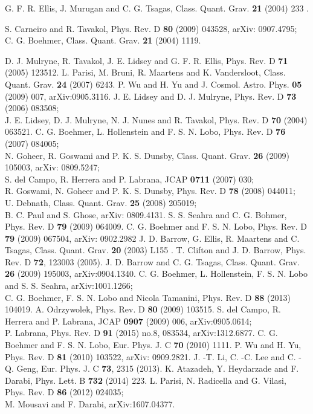 \documentclass[showpacs,amsmath,nofootinbib,amssymb,epsfig]{revtex4}
\begin{document}
\begin{thebibliography}{}
G. F. R. Ellis, J. Murugan and C. G. Tsagas,  Class. Quant. Grav. {\bf 21} (2004) 233 .

 S. Carneiro and R. Tavakol, Phys. Rev. D {\bf 80} (2009) 043528,  arXiv: 0907.4795; \\C. G. Boehmer, Class. Quant. Grav. {\bf21} (2004) 1119.

  D. J. Mulryne, R. Tavakol, J. E. Lidsey and  G. F. R. Ellis,  Phys. Rev. D {\bf 71} (2005) 123512.
  L. Parisi, M. Bruni, R. Maartens and K. Vandersloot, Class. Quant. Grav. {\bf 24} (2007) 6243.
      P. Wu and H. Yu and J. Cosmol. Astro. Phys. {\bf 05} (2009) 007,  arXiv:0905.3116.
 J. E. Lidsey and D. J. Mulryne,  Phys. Rev. D {\bf 73} (2006) 083508;\\J. E. Lidsey, D. J. Mulryne, N. J. Nunes and
R. Tavakol, Phys. Rev. D \textbf{70} (2004) 063521.
 C. G. Boehmer, L. Hollenstein and F. S. N. Lobo,  Phys. Rev. D {\bf 76} (2007) 084005;\\
                     N. Goheer, R. Goswami and P. K. S. Dunsby, Class. Quant. Grav. {\bf 26} (2009) 105003,  arXiv: 0809.5247;\\
                     S. del Campo, R. Herrera and P. Labrana, JCAP {\bf 0711} (2007)  030;\\
                     R. Goswami, N. Goheer and P. K. S. Dunsby, Phys. Rev. D {\bf 78} (2008) 044011;\\
                     U. Debnath, Class. Quant. Grav. {\bf 25} (2008) 205019;\\
                     B. C. Paul  and S. Ghose, arXiv: 0809.4131.
 S. S. Seahra and C. G. Bohmer,  Phys. Rev. D {\bf 79} (2009) 064009.
 C. G. Boehmer and F. S. N. Lobo,  Phys. Rev. D {\bf 79} (2009) 067504,  arXiv: 0902.2982
  J. D. Barrow, G. Ellis, R. Maartens and C. Tsagas, Class. Quant. Grav. {\bf 20} (2003) L155 .
 T. Clifton and J. D. Barrow, Phys. Rev. D {\bf 72},  123003 (2005).
 J. D. Barrow and C. G. Tsagas, Class. Quant. Grav. {\bf 26} (2009) 195003, arXiv:0904.1340.
 C. G. Boehmer, L. Hollenstein, F. S. N. Lobo and  S. S. Seahra, arXiv:1001.1266;\\
C. G. Boehmer, F. S. N. Lobo and Nicola Tamanini, Phys. Rev. D {\bf 88} (2013) 104019.
 A. Odrzywolek, Phys. Rev. D {\bf 80} (2009) 103515.
S. del Campo, R. Herrera and P. Labrana, JCAP \textbf{0907} (2009) 006, arXiv:0905.0614;\\
P. Labrana, Phys. Rev. D \textbf{91} (2015) no.8, 083534, arXiv:1312.6877.
C. G. Boehmer and F. S. N. Lobo, Eur. Phys. J. C {\bf 70} (2010) 1111.
 P. Wu and H. Yu, Phys. Rev. D {\bf 81}  (2010) 103522, arXiv: 0909.2821.
J. -T. Li, C. -C. Lee and C. -Q. Geng, Eur. Phys. J. C {\bf 73}, 2315 (2013).
K. Atazadeh, Y. Heydarzade and F. Darabi, Phys. Lett. B \textbf{732} (2014) 223.
L. Parisi, N. Radicella and G. Vilasi, Phys. Rev. D {\bf86} (2012) 024035;\\ M. Mousavi and F. Darabi,  arXiv:1607.04377.


\end{thebibliography}
\end{document}
